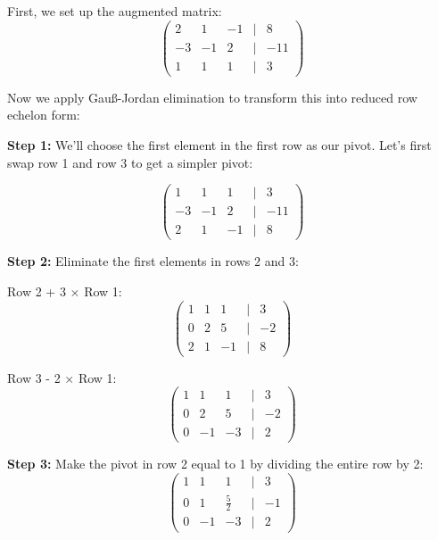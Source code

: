 First, we set up the augmented matrix:
\begin{equation*}
\begin{pmatrix}
2 & 1 & -1 & | & 8 \\
-3 & -1 & 2 & | & -11 \\
1 & 1 & 1 & | & 3
\end{pmatrix}
\end{equation*}

Now we apply Gauß-Jordan elimination to transform this into reduced row echelon form:

\textbf{Step 1:} We'll choose the first element in the first row as our pivot. Let's first swap row 1 and row 3 to get a simpler pivot:

\begin{equation*}
\begin{pmatrix}
1 & 1 & 1 & | & 3 \\
-3 & -1 & 2 & | & -11 \\
2 & 1 & -1 & | & 8
\end{pmatrix}
\end{equation*}

\textbf{Step 2:} Eliminate the first elements in rows 2 and 3:

Row 2 + 3 \(\times\) Row 1:
\begin{equation*}
\begin{pmatrix}
1 & 1 & 1 & | & 3 \\
0 & 2 & 5 & | & -2 \\
2 & 1 & -1 & | & 8
\end{pmatrix}
\end{equation*}

Row 3 - 2 \(\times\) Row 1:
\begin{equation*}
\begin{pmatrix}
1 & 1 & 1 & | & 3 \\
0 & 2 & 5 & | & -2 \\
0 & -1 & -3 & | & 2
\end{pmatrix}
\end{equation*}

\textbf{Step 3:} Make the pivot in row 2 equal to 1 by dividing the entire row by 2:
\begin{equation*}
\begin{pmatrix}
1 & 1 & 1 & | & 3 \\
0 & 1 & \frac{5}{2} & | & -1 \\
0 & -1 & -3 & | & 2
\end{pmatrix}
\end{equation*}

